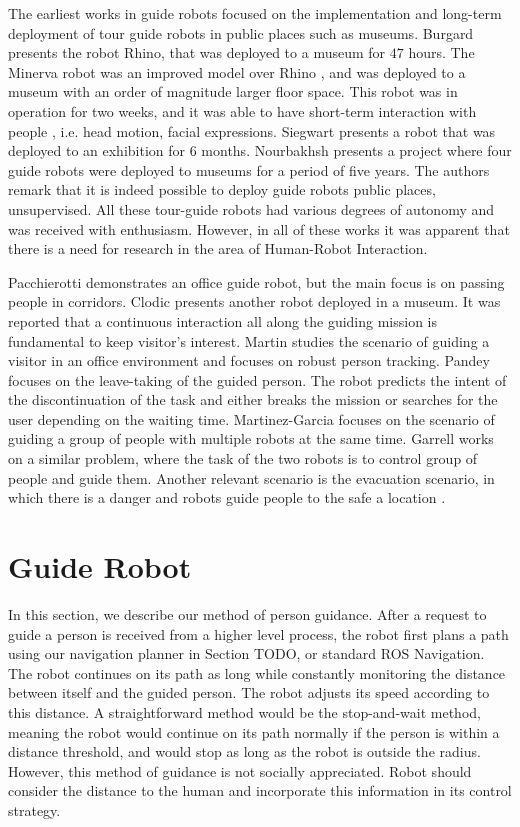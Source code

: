 \documentclass[12pt]{gatech-thesis}
\begin{document}
The earliest works in guide robots focused on the implementation and long-term deployment of tour guide robots in public places such as museums. Burgard \cite{burgard1998interactive} presents the robot Rhino, that was deployed to a museum for $47$ hours. The Minerva robot was an improved model over Rhino \cite{thrun1999minerva}, and was deployed to a museum with an order of magnitude larger floor space. This robot was in operation for two weeks, and it was able to have short-term interaction with people , i.e. head motion, facial expressions. Siegwart \cite{siegwart2003robox} presents a robot that was deployed to an exhibition for 6 months. Nourbakhsh \cite{nourbakhsh2003mobot} presents a project where four guide robots were deployed to museums for a period of five years. The authors remark that it is indeed possible to deploy guide robots public places, unsupervised. All these tour-guide robots had various degrees of autonomy and was received with enthusiasm. However, in all of these works it was apparent that there is a need for research in the area of Human-Robot Interaction.

Pacchierotti \cite{pacchierotti2006design} demonstrates an office guide robot, but the main focus is on passing people in corridors. Clodic \cite{clodic2006rackham} presents another robot deployed in a museum. It was reported that a continuous interaction all along the guiding mission is fundamental to keep visitor's interest. Martin \cite{martin2004conception} studies the scenario of guiding a visitor in an office environment and focuses on robust person tracking. Pandey \cite{pandey2009step} focuses on the leave-taking of the guided person. The robot predicts the intent of the discontinuation of the task and either breaks the mission or searches for the user depending on the waiting time. Martinez-Garcia \cite{martinez2005crowding} focuses on the scenario of guiding a group of people with multiple robots at the same time. Garrell \cite{garrell2010local} works on a similar problem, where the task of the two robots is to control group of people and guide them. Another relevant scenario is the evacuation scenario, in which there is a danger and robots guide people to the safe a location \cite{kim2009portable,robinette2011incorporating}.


\section{Guide Robot}

In this section, we describe our method of person guidance. After a request to guide a person is received from a higher level process, the robot first plans a path using our navigation planner in Section TODO, or standard ROS Navigation. The robot continues on its path as long while constantly monitoring the distance between itself and the guided person. The robot adjusts its speed according to this distance. A straightforward method would be the stop-and-wait method, meaning the robot would continue on its path normally if the person is within a distance threshold, and would stop as long as the robot is outside the radius. However, this method of guidance is not socially appreciated. Robot should consider the distance to the human and incorporate this information in its control strategy.
\end{document}
